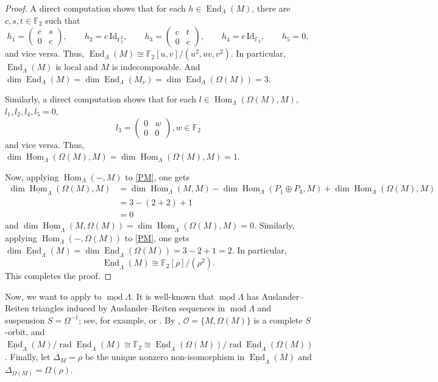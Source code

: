 \documentclass[a4paper,reqno,10pt]{amsart}
\numberwithin{equation}{section}
\DeclareMathOperator{\modu}{mod}
\DeclareMathOperator{\End}{End}
\newcommand{\kk}{\mathbb F_2}
\newcommand{\cO}{\mathcal O}
\newcommand{\Lam}{\Lambda}
\newcommand{\ol}[1]{\underline{#1}}
\begin{document}
\begin{proof}
\vskip5pt

A direct computation shows that for each $h\in \End_\Lam(M)$, there are $c,s,t\in\kk$ such that
\[
 h_1=\begin{pmatrix}c&s\\0&c\end{pmatrix},\qquad
 h_2=c\,\mathrm{Id}_{\kk^2},\qquad
 h_3=\begin{pmatrix}c&t\\0&c\end{pmatrix},\qquad
 h_4=c\,\mathrm{Id}_{\kk},\qquad h_5=0, 
\]
and vice versa. Thus, $\End_\Lam(M)\cong \kk[u,v]/(u^2, uv, v^2)$. In particular, $\End_\Lam(M)$ is local and $M$ is indecomposable. And $\dim \operatorname{End}_\Lambda(M)=\dim \operatorname{End}_\Lambda(M_\nu)=\dim \operatorname{End}_\Lambda(\Omega(M))=3$. 

\vskip5pt

Similarly, a direct computation shows that for each $l\in \operatorname{Hom}_\Lambda(\Omega(M), M)$, $l_1,l_2,l_4,l_5=0$,
\[
 l_3=\begin{pmatrix}0&w\\0&0\end{pmatrix}, w\in \kk
\]
and vice versa. Thus, $\dim \operatorname{Hom}_\Lambda(\Omega(M), M)=\dim \operatorname{Hom}_\Lambda(\Omega(M), M)=1$. 

\vskip5pt

Now, applying $\operatorname{Hom}_\Lambda(-, M)$ to \eqref{PM}, one gets
\[
\begin{aligned}
\dim \ol{\operatorname{Hom}}_\Lambda(\Omega(M), M)&=\dim \operatorname{Hom}_\Lambda(M, M)-\dim \operatorname{Hom}_\Lambda(P_1\oplus P_3, M)+\dim \operatorname{Hom}_\Lambda(\Omega(M), M)\\
 &= 3-(2+2)+1\\
 &=0
\end{aligned}
\]
and $\dim \ol{\operatorname{Hom}}_\Lambda(M, \Omega(M))=\dim \ol{\operatorname{Hom}}_\Lambda(\Omega(M), M)=0$. Similarly, applying $\operatorname{Hom}_\Lambda(-, \Omega(M))$ to \eqref{PM}, one gets $\dim \ol{\operatorname{End}}_\Lambda(M)=\dim \ol{\operatorname{End}}_\Lambda(\Omega(M))=3-2+1=2$. In particular, 
\[
\ol{\End}_\Lam(M)\cong\kk[\rho]/(\rho^2). 
\]
This completes the proof. 
\end{proof}

Now, we want to apply  to $\ol{\modu} \Lambda$. It is well-known that $\ol{\modu} \Lambda$ has Auslander--Reiten triangles induced by Auslander--Reiten sequences in $\modu\Lambda$ and suspension $S= \Omega^{-1}$; see, for example, \cite{AuslanderReitenSmalo1995, Happel1988} or \cite[Theorem I.2.4]{ReitenVanDenBergh2002}. By , $\cO=\{M, \Omega(M)\}$ is a complete $S$-orbit, and $\ol{\End}_{\Lambda}(M)/\operatorname{rad}\ol{\End}_{\Lambda}(M)\cong\kk\cong \ol{\End}_{\Lambda}(\Omega(M))/\operatorname{rad}\ol{\End}_{\Lambda}(\Omega(M))$. Finally, let $\Delta_M=\rho$ be the unique nonzero non-isomorphism in $\ol{\End}_{\Lambda}(M)$ and $\Delta_{\Omega(M)}=\Omega(\rho)$. 
\end{document}
